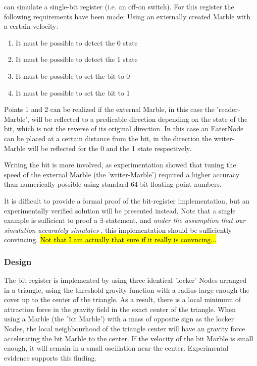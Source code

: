 \nenwin can simulate a single-bit register (i.e. an off-on switch).
For this register the following requirements have been made:
Using an externally created Marble with a certain velocity:
\begin{enumerate}
    \item It must be possible to detect the 0 state
    \item It must be possible to detect the 1 state
    \item It must be possible to set the bit to 0
    \item It must be possible to set the bit to 1
\end{enumerate}
Points 1 and 2 can be realized if the external Marble, in this case the 'reader-Marble', will be reflected to a predicable direction depending on the state of the bit, which is not the reverse of its original direction. In this case an EaterNode can be placed at a certain distance from the bit, in the direction the writer-Marble will be reflected for the 0 and the 1 state respectively.

Writing the bit is more involved, as experimentation showed that tuning the speed of the external Marble (the 'writer-Marble') required a higher accuracy than numerically possible using standard 64-bit floating point numbers.

It is difficult to provide a formal proof of the bit-register implementation, but an experimentally verified solution will be presented instead. Note that a single example is sufficient to proof a $\exists$-statement, and \textit{under the assumption that our simulation accurately simulates \nenwin}, this implementation should be sufficiently convincing. \hl{Not that I am actually that sure if it really is convncing...}

\subsubsection{Design}
The bit register is implemented by using three identical 'locker' Nodes arranged in a triangle, using the threshold gravity function with a radius large enough the cover up to the center of the triangle. As a result, there is a local minimum of attraction force in the gravity field in the exact center of the triangle. When using a Marble (the 'bit Marble') with a mass of opposite sign as the locker Nodes, the local neighbourhood of the triangle center will have an gravity force accelerating the bit Marble to the center. If the velocity of the bit Marble is small enough, it will remain in a small oscillation near the center. Experimental evidence supports this finding.


